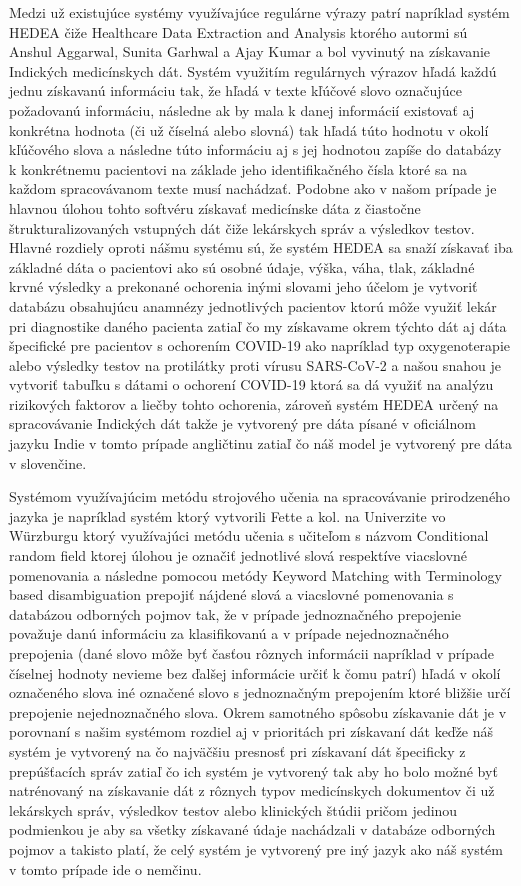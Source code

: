Medzi už existujúce systémy využívajúce regulárne
výrazy patrí napríklad systém HEDEA \cite{hedea} čiže 
Healthcare Data Extraction and Analysis ktorého
autormi sú Anshul Aggarwal, Sunita Garhwal a Ajay Kumar 
a bol vyvinutý na získavanie Indických medicínskych dát.
Systém využitím regulárnych výrazov hľadá každú jednu
získavanú informáciu tak, že hľadá v texte kľúčové slovo
označujúce požadovanú informáciu, následne ak by mala 
k danej informácií existovať aj konkrétna hodnota
(či už číselná alebo slovná) tak hľadá túto hodnotu v okolí
kľúčového slova a následne túto informáciu aj 
s jej hodnotou zapíše do databázy k konkrétnemu 
pacientovi na základe jeho identifikačného
čísla ktoré sa na každom spracovávanom texte musí nachádzať. 
Podobne ako v našom prípade je hlavnou úlohou tohto 
softvéru získavať medicínske dáta z čiastočne štrukturalizovaných
vstupných dát čiže lekárskych správ a výsledkov testov.
Hlavné rozdiely oproti nášmu systému sú, že systém HEDEA
sa snaží získavať iba základné dáta o pacientovi ako sú osobné
údaje, výška, váha, tlak, základné krvné výsledky a 
prekonané ochorenia inými slovami jeho účelom je vytvoriť
databázu obsahujúcu anamnézy jednotlivých pacientov
ktorú môže využiť lekár pri diagnostike daného pacienta
zatiaľ čo my získavame okrem týchto dát aj dáta 
špecifické pre pacientov s ochorením COVID-19 ako
napríklad typ oxygenoterapie alebo výsledky testov
na protilátky proti vírusu SARS-CoV-2 a našou snahou je 
vytvoriť tabuľku s dátami o ochorení COVID-19 ktorá
sa dá využiť na analýzu rizikových faktorov a liečby
tohto ochorenia, zároveň systém HEDEA určený na 
spracovávanie Indických dát
takže je vytvorený pre dáta písané v oficiálnom jazyku
Indie v tomto prípade angličtinu zatiaľ čo náš model
je vytvorený pre dáta v slovenčine.

Systémom využívajúcim metódu strojového učenia na
spracovávanie prirodzeného jazyka je napríklad 
systém ktorý vytvorili Fette a kol. na Univerzite
vo Würzburgu \cite{infExtGer} ktorý využívajúci metódu učenia s 
učiteľom s názvom Conditional random field ktorej úlohou
je označiť jednotlivé slová respektíve viacslovné
pomenovania \cite{CRF} a následne pomocou metódy 
Keyword Matching with Terminology based disambiguation
prepojiť nájdené slová a viacslovné pomenovania s databázou
odborných pojmov tak, že v prípade jednoznačného prepojenie 
považuje danú informáciu za klasifikovanú a v
prípade nejednoznačného prepojenia (dané slovo môže byť časťou
rôznych informácii napríklad v prípade číselnej hodnoty nevieme
bez ďalšej informácie určiť k čomu patrí) hľadá v okolí označeného 
slova iné označené slovo s jednoznačným prepojením ktoré bližšie 
určí prepojenie nejednoznačného slova. Okrem samotného spôsobu
získavanie dát je v porovnaní s našim systémom rozdiel 
aj v prioritách pri získavaní dát keďže náš systém 
je vytvorený na čo najväčšiu presnosť pri získavaní
dát špecificky z prepúšťacích správ zatiaľ čo ich 
systém je vytvorený tak aby ho bolo možné byť natrénovaný na 
získavanie dát z rôznych typov medicínskych dokumentov či už
lekárskych správ, výsledkov testov alebo klinických 
štúdii pričom jedinou podmienkou je aby sa všetky získavané údaje 
nachádzali v databáze odborných pojmov a takisto platí, 
že celý systém je vytvorený 
pre iný jazyk ako náš systém v tomto prípade ide o 
nemčinu. 

